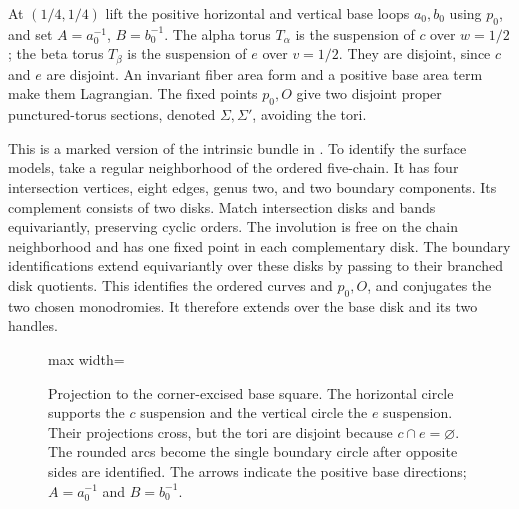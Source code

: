 \documentclass[11pt]{amsart}
\theoremstyle{definition}
\theoremstyle{remark}
\begin{document}
At $(1/4,1/4)$ lift the positive horizontal and vertical base loops
$a_0,b_0$ using $p_0$, and set $A=a_0^{-1}$, $B=b_0^{-1}$.
The alpha torus $T_\alpha$ is the suspension of $c$ over $w=1/2$;
the beta torus $T_\beta$ is the suspension of $e$ over $v=1/2$.
They are disjoint, since $c$ and $e$ are disjoint.
An invariant fiber area form and a positive base area term make them
Lagrangian. The fixed points $p_0,O$ give two disjoint proper
punctured-torus sections, denoted $\Sigma,\Sigma'$, avoiding the tori.

This is a marked version of the intrinsic bundle in
\cite[Section 1]{LP25}. To identify the surface models, take a regular
neighborhood of the ordered five-chain. It has four intersection
vertices, eight edges, genus two, and two boundary components. Its
complement consists of two disks. Match intersection disks and bands
equivariantly, preserving cyclic orders. The involution is free on
the chain neighborhood and has one fixed point in each complementary
disk. The boundary identifications extend equivariantly over these
disks by passing to their branched disk quotients. This identifies the
ordered curves and $p_0,O$, and conjugates the two chosen monodromies.
It therefore extends over the base disk and its two handles.

\begin{figure}[htbp]
\centering
\begin{adjustbox}{max width=\textwidth}
\end{adjustbox}
\caption{Projection to the corner-excised base square. The horizontal
circle supports the $c$ suspension and the vertical circle the $e$
suspension. Their projections cross, but the tori are disjoint because
$c\cap e=\varnothing$. The rounded arcs become the single boundary
circle after opposite sides are identified. The arrows indicate the
positive base directions; $A=a_0^{-1}$ and $B=b_0^{-1}$.}
\label{fig:base}
\end{figure}
\end{document}
